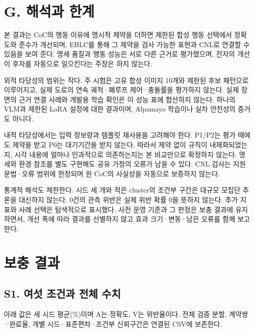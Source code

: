 \documentclass[11pt,a4paper]{article}
\begin{document}
\section*{G. 해석과 한계}

본 결과는 CoC의 행동 이유에 명시적 제약을 더하면 제한된 합성 행동 선택에서 정확도와 준수가 개선되며, EBLC를 통해 그 제약을 검사 가능한 표현과 CNL로 연결할 수 있음을 보여 준다. 명세 품질과 행동 성능은 서로 다른 근거로 평가했으며, 전자의 개선이 후자를 자동으로 일으킨다는 주장은 하지 않는다.\par

외적 타당성의 범위는 작다. 주 시험은 고유 합성 이미지 10개와 제한된 후보 패턴으로 이루어지고, 실제 도로의 연속 궤적·폐루프 제어·충돌률을 평가하지 않는다. 실제 장면의 근거 연결 사례와 개발용 학습 확인은 이 성능 표에 합산하지 않는다. 하나의 VLM과 제한된 LoRA 설정에 대한 결과이며, Alpamayo 학습이나 실차 안전성의 증거도 아니다.\par

내적 타당성에서는 입력 정보량과 템플릿 재사용을 고려해야 한다. P1/P2는 평가 때에도 제약을 받고 P0는 대기기간을 받지 않는다. 따라서 제약 없이 규칙이 내재화되었는지, 시각 내용에 얼마나 인과적으로 의존하는지는 본 비교만으로 확정하지 않는다. 명세와 환경 참조를 별도 구현해도 공유 가정의 오류가 남을 수 있다. CNL 검사는 지원 문법·오류 범위에 한정되며 원 CoC의 사실성을 자동으로 보증하지 않는다.\par

통계적 해석도 제한한다. 시드 세 개와 적은 cluster의 조건부 구간은 대규모 모집단 추론을 대신하지 않는다. 0건의 관측 위반은 실제 위반 확률 0을 뜻하지 않는다. 추가 지표와 사례 선택은 탐색적으로 표시했다. 사전 운영 기준과 그 판정은 보충 결과에 유지하면서, 개선 폭에 따라 결과를 선별하지 않고 효과 크기·변동·남은 오류를 함께 보고한다.\par

\section*{보충 결과}

\subsection*{S1. 여섯 조건과 전체 수치}

아래 값은 세 시드 평균(\%)이며 A는 정확도, V는 위반율이다. 전체 검증 분할, 계약쌍·완료율, 개별 시드·표준편차·조건부 신뢰구간은 연결된 CSV에 보존한다.\par
\end{document}
